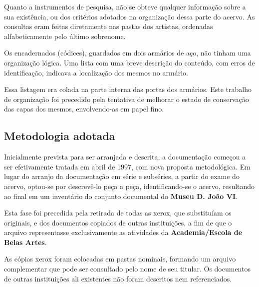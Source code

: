 Quanto a instrumentos de pesquisa, não se obteve qualquer informação sobre a sua existência, ou dos critérios adotados na organização dessa parte do acervo. As consultas eram feitas diretamente nas pastas dos artistas, ordenadas alfabeticamente pelo último sobrenome.

Os encadernados (códices), guardados em dois armários de aço, não tinham uma organização lógica. Uma lista com uma breve descrição do conteúdo, com erros de identificação, indicava a localização dos mesmos no armário.

Essa listagem era colada na parte interna das portas dos armários. Este trabalho de organização foi precedido pela tentativa de melhorar o estado de conservação das capas dos mesmos, envolvendo-as em papel fino.

\subsection{Metodologia adotada}

Inicialmente prevista para ser arranjada e descrita, a documentação começou a ser efetivamente tratada em abril de 1997, com nova proposta metodológica. Em lugar do arranjo da documentação em série e subséries, a partir do exame do acervo, optou-se por descrevê-lo peça a peça, identificando-se o acervo, resultando ao final em um inventário do conjunto documental do \textbf{Museu D. João VI}.

Esta fase foi precedida pela retirada de todas as xerox, que substituíam os originais, e dos documentos copiados de outras instituições, a fim de que o arquivo representasse exclusivamente as atividades da \textbf{Academia/Escola de Belas Artes}.

As cópias xerox foram colocadas em pastas nominais, formando um arquivo complementar que pode ser consultado pelo nome de seu titular. Os documentos de outras instituições ali existentes não foram descritos nem referenciados.

